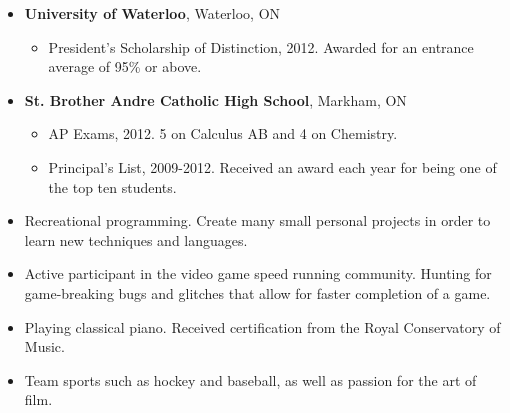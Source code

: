 \documentclass[10pt,letterpaper]{article}
\begin{document}
\begin{itemize}
\parskip=0.1em
\item\textbf{University of Waterloo}, Waterloo, ON
\begin{itemize}
\item President's Scholarship of Distinction, 2012.  Awarded for an entrance average of 95\% or above.
\end{itemize}
\item\textbf{St. Brother Andre Catholic High School}, Markham, ON
\begin{itemize}
\item AP Exams, 2012.  5 on Calculus AB and 4 on Chemistry.
\item Principal's List, 2009-2012.  Received an award each year for being one of the top ten students.
\end{itemize}
\end{itemize}

\begin{itemize}
\parskip=0.1em
\item Recreational programming.  Create many small personal projects in order to learn new techniques and languages.
\item Active participant in the video game speed running community.  Hunting for game-breaking bugs and glitches that allow for faster completion of a game.
\item Playing classical piano.  Received certification from the Royal Conservatory of Music.
\item Team sports such as hockey and baseball, as well as passion for the art of film.
\end{itemize}
\end{document}
